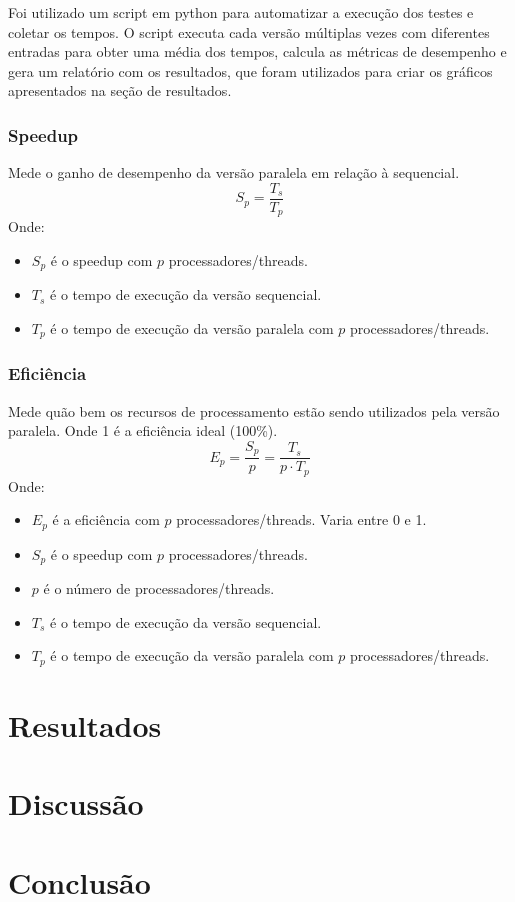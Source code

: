 \documentclass[12pt, a4paper]{article}
\begin{document}
    Foi utilizado um script em python para automatizar a execução dos testes e coletar os tempos. O script executa cada versão múltiplas vezes com diferentes entradas para obter uma média dos tempos, calcula as métricas de desempenho e gera um relatório com os resultados, que foram utilizados para criar os gráficos apresentados na seção de resultados.

    \subsubsection{Speedup}
	Mede o ganho de desempenho da versão paralela em relação à sequencial.
	\[
		S_{p} = \frac{T_{s}}{T_{p}}
	\]
	Onde:
	\begin{itemize}
		\item $S_{p}$ é o speedup com $p$ processadores/threads.

		\item $T_{s}$ é o tempo de execução da versão sequencial.

		\item $T_{p}$ é o tempo de execução da versão paralela com $p$ processadores/threads.
	\end{itemize}

	\subsubsection{Eficiência}
    Mede quão bem os recursos de processamento estão sendo utilizados pela versão paralela. Onde 1 é a eficiência ideal (100\%).
	\[
		E_{p} = \frac{S_{p}}{p}= \frac{T_{s}}{p \cdot T_{p}}
	\]
	Onde:
	\begin{itemize}
		\item $E_{p}$ é a eficiência com $p$ processadores/threads. Varia entre 0 e 1.

		\item $S_{p}$ é o speedup com $p$ processadores/threads.

        \item $p$ é o número de processadores/threads.

        \item $T_{s}$ é o tempo de execução da versão sequencial.

        \item $T_{p}$ é o tempo de execução da versão paralela com $p$ processadores/threads.
	\end{itemize}

    \newpage
    \section{Resultados}\label{sec:resultados}


    \newpage
    \section{Discussão}\label{sec:discussao}


    \newpage
    \section{Conclusão}\label{sec:conclusao}

\end{document}
